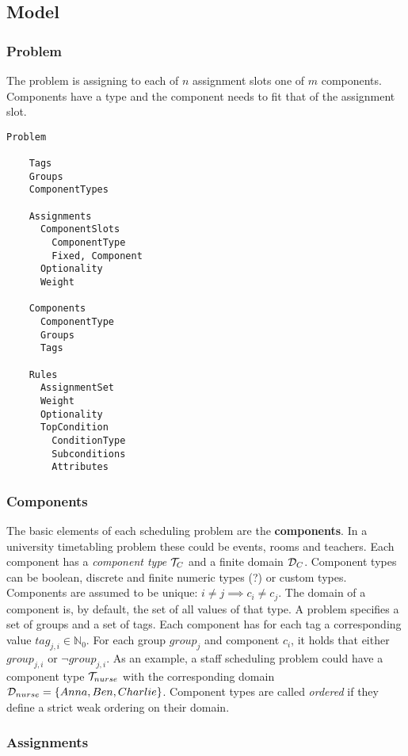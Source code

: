 \subsection{Model}

\subsubsection*{Problem}

The problem is assigning to each of $n$ assignment slots one of $m$ components. Components have a type and the component needs to fit that of the assignment slot.

\begin{lstlisting}
Problem

	Tags
	Groups
	ComponentTypes	
	
	Assignments
	  ComponentSlots
	    ComponentType
	    Fixed, Component
	  Optionality
	  Weight
	
	Components
	  ComponentType
	  Groups
	  Tags
	
	Rules
	  AssignmentSet
	  Weight
	  Optionality
	  TopCondition
	    ConditionType
	    Subconditions
	    Attributes
\end{lstlisting}


\subsubsection{Components}

The basic elements of each scheduling problem are the \textbf{components}. In a university timetabling problem these could be events, rooms and teachers.
Each component has a \textit{component type} $\mathcal{T}_C$ and a finite domain $\mathcal{D}_C$.
Component types can be boolean, discrete and finite numeric types (?) or custom types.
Components are assumed to be unique: $i\neq j \implies c_i\neq c_j$.
The domain of a component is, by default, the set of all values of that type.
A problem specifies a set of groups and a set of tags. Each component has for each tag a corresponding value $tag_{j,i}\in\mathbb{N}_0$. For each group $group_j$ and component $c_i$, it holds that either $group_{j,i}$ or $\neg group_{j,i}$.
As an example, a staff scheduling problem could have a component type $\mathcal{T}_{nurse}$ with the corresponding domain $\mathcal{D}_{nurse}=\{Anna, Ben, Charlie\}$. 
Component types are called \textit{ordered} if they define a strict weak ordering on their domain.


\subsubsection{Assignments}

